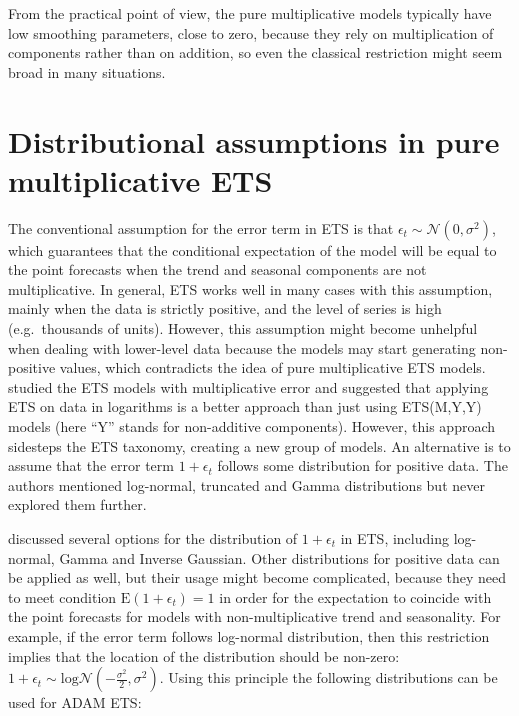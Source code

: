 \documentclass[]{book}
\theoremstyle{definition}
\theoremstyle{definition}
\theoremstyle{definition}
\theoremstyle{definition}
\theoremstyle{remark}
\begin{document}
From the practical point of view, the pure multiplicative models typically have low smoothing parameters, close to zero, because they rely on multiplication of components rather than on addition, so even the classical restriction might seem broad in many situations.

\hypertarget{ADAMETSMultiplicativeDistributions}{%
\section{Distributional assumptions in pure multiplicative ETS}\label{ADAMETSMultiplicativeDistributions}}

The conventional assumption for the error term in ETS is that \(\epsilon_t\sim\mathcal{N}(0,\sigma^2)\), which guarantees that the conditional expectation of the model will be equal to the point forecasts when the trend and seasonal components are not multiplicative. In general, ETS works well in many cases with this assumption, mainly when the data is strictly positive, and the level of series is high (e.g.~thousands of units). However, this assumption might become unhelpful when dealing with lower-level data because the models may start generating non-positive values, which contradicts the idea of pure multiplicative ETS models. \citet{Akram2009} studied the ETS models with multiplicative error and suggested that applying ETS on data in logarithms is a better approach than just using ETS(M,Y,Y) models (here ``Y'' stands for non-additive components). However, this approach sidesteps the ETS taxonomy, creating a new group of models. An alternative \citep[also discussed in][]{Akram2009} is to assume that the error term \(1+\epsilon_t\) follows some distribution for positive data. The authors mentioned log-normal, truncated and Gamma distributions but never explored them further.

\citet{Svetunkov2020ETS} discussed several options for the distribution of \(1+\epsilon_t\) in ETS, including log-normal, Gamma and Inverse Gaussian. Other distributions for positive data can be applied as well, but their usage might become complicated, because they need to meet condition \(\mathrm{E}(1+\epsilon_t)=1\) in order for the expectation to coincide with the point forecasts for models with non-multiplicative trend and seasonality. For example, if the error term follows log-normal distribution, then this restriction implies that the location of the distribution should be non-zero: \(1+\epsilon_t\sim\mathrm{log}\mathcal{N}\left(-\frac{\sigma^2}{2},\sigma^2\right)\). Using this principle the following distributions can be used for ADAM ETS:
\end{document}
